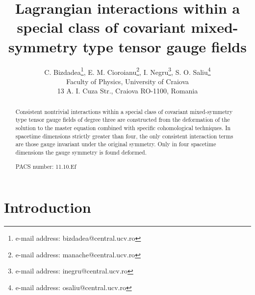 \documentclass[a4paper,12pt]{article}
\begin{document}
\author{C. Bizdadea\thanks{%
e-mail address: bizdadea@central.ucv.ro}, E. M. Cioroianu\thanks{%
e-mail address: manache@central.ucv.ro}, I. Negru\thanks{%
e-mail address: inegru@central.ucv.ro}, S. O. Saliu\thanks{%
e-mail address: osaliu@central.ucv.ro} \\
Faculty of Physics, University of Craiova\\
13 A. I. Cuza Str., Craiova RO-1100, Romania}
\title{Lagrangian interactions within a special class of covariant mixed-symmetry
type tensor gauge fields}
\maketitle

\begin{abstract}
Consistent nontrivial interactions within a special class of covariant
mixed-symmetry type tensor gauge fields of degree three are constructed from
the deformation of the solution to the master equation combined with
specific cohomological techniques. In spacetime dimensions strictly greater
than four, the only consistent interaction terms are those gauge invariant
under the original symmetry. Only in four spacetime dimensions the gauge
symmetry is found deformed.

PACS number: 11.10.Ef
\end{abstract}

\section{Introduction}
\end{document}
